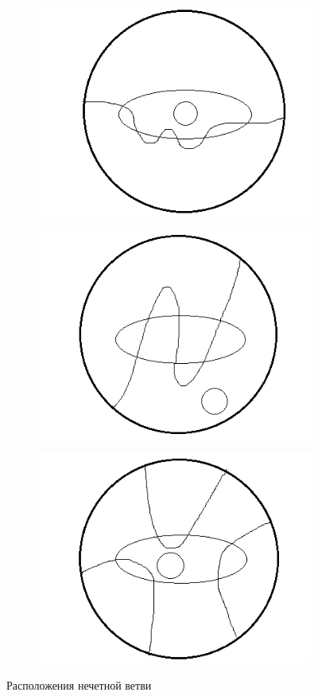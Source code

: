 \documentclass[14pt]{article}
\begin{document}
\begin{figure}[H]
     \begin{subfigure}[b]{0.2\textwidth}
    \centering
    \includegraphics[scale=0.55]{loc_odd_brunch_1.png}
    \caption{}
  \end{subfigure}
  \hspace{2cm}
  \begin{subfigure}[b]{0.2\textwidth}
    \centering
    \includegraphics[scale=0.55]{loc_odd_brunch_2.png}
    \caption{}
  \end{subfigure}
  \hspace{2cm}
  \begin{subfigure}[b]{0.2\textwidth}
    \centering
    \includegraphics[scale=0.55]{loc_odd_brunch_3.png}
    \caption{}
  \end{subfigure}
\caption{Расположения нечетной ветви}
\label{fig:loc_odd_brunch}
\end{figure}
\end{document}
